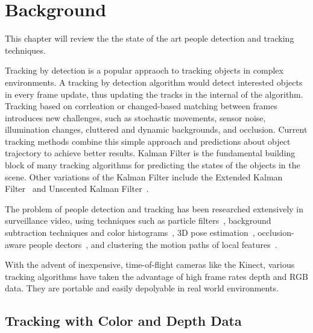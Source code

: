 


\chapter{Background}

\label{chapter:background}

This chapter will review the the state of the art people detection and tracking techniques.

Tracking by detection is a popular appraoch to tracking objects in complex environments. A tracking by detection algorithm would detect interested objects in every frame update, thus updating the tracks in the internal of the algorithm. Tracking based on corrleation or changed-based matching between frames introduces new challenges, such as stochastic movements, sensor noise, illumination changes, cluttered and dynamic backgrounds, and occlusion. Current tracking methods combine this simple approach and predictions about object trajectory to achieve better results. Kalman Filter is the fundamental building block of many tracking algorithms for predicting the states of the objects in the scene. Other variations of the Kalman Filter include the Extended Kalman Filter~\cite{ljung_extended_kalman} and Unscented Kalman Filter~\cite{julier_unscented_kalman}.

The problem of people detection and tracking has been researched extensively in surveillance video, using techniques such as particle filters~\cite{sherrah_particle_filter_video_surveillance}, background subtraction techniques and color histograms~\cite{mckenna_tracking_groups_of_people}, 3D pose estimation~\cite{andriluka_3d_pose_estimation_tracking}, occlusion-aware people dectors~\cite{tang_people_dectector}, and clustering the motion paths of local features~\cite{gudys_cluster_local_features}.

With the advent of inexpensive, time-of-flight cameras like the Kinect, various tracking algorithms have taken the advantage of high frame rates depth and RGB data. They are portable and easily depolyable in real world environments.

\section{Tracking with Color and Depth Data}

